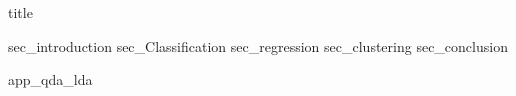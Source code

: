 \documentclass[12pt, a4paper]{article}
\begin{document}
{title}
\newpage
\tableofcontents
\newpage
\listoffigures
{sec_introduction}
{sec_Classification}
{sec_regression}
{sec_clustering}
{sec_conclusion}
\newpage


\appendix
{app_qda_lda}
\end{document}
